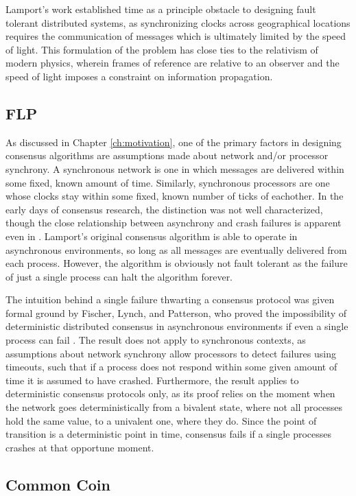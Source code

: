 Lamport's work established time as a principle obstacle to designing fault tolerant distributed systems,
as synchronizing clocks across geographical locations requires the communication of messages 
which is ultimately limited by the speed of light.
This formulation of the problem has close ties to the relativism of modern physics,
wherein frames of reference are relative to an observer and the speed of light imposes a constraint on information propagation.

\subsection{FLP}
As discussed in Chapter \ref{ch:motivation}, 
one of the primary factors in designing consensus algorithms are assumptions made about 
network and/or processor synchrony. 
A synchronous network is one in which messages are delivered within some fixed, 
known amount of time. 
Similarly, synchronous processors are one whose clocks stay within some fixed, 
known number of ticks of eachother.
In the early days of consensus research, the distinction was not well characterized, 
though the close relationship between asynchrony and crash failures is apparent even in \cite{clocks}.
Lamport's original consensus algorithm is able to operate in asynchronous environments, 
so long as all messages are eventually delivered from each process.
However, the algorithm is obviously not fault tolerant as the failure of just a single process can halt the algorithm forever.

The intuition behind a single failure thwarting a consensus protocol was given formal ground by Fischer, Lynch, and Patterson,
who proved the impossibility of deterministic distributed consensus in asynchronous environments if even a single process can fail \cite{flp}.
The result does not apply to synchronous contexts, 
as assumptions about network synchrony allow processors to detect failures using timeouts, 
such that if a process does not respond within some given amount of time it is assumed to have crashed.
Furthermore, the result applies to deterministic consensus protocols only, 
as its proof relies on the moment when the network goes deterministically from a bivalent state, 
where not all processes hold the same value, to a univalent one, where they do.
Since the point of transition is a deterministic point in time, 
consensus fails if a single processes crashes at that opportune moment.

\subsection{Common Coin}

